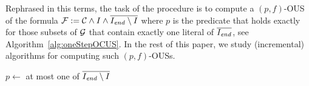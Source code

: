 Rephrased in this terms, the task of the procedure \onestep is to compute a $(p,f)$-OUS of the formula $\mathcal{F}  := \mathcal{C} \land I\land \overline{I_\mathit{end} \setminus I}$ where $p$ is the predicate that holds exactly for those subsets of $\mathcal{G} $ that contain exactly one literal of $\overline{I_\mathit{end} }$, see Algorithm~\eqref{alg:oneStepOCUS}. 
In the rest of this paper, we study (incremental) algorithms for computing such $(p,f)$-OUSs. 

\begin{algorithm}[t]
  \DontPrintSemicolon
  
  \caption{$\onestep(\formulac,f,I,\Iend)$}
  \label{alg:oneStepOCUS}
  $p \leftarrow$ at most one of $\overline{I_\mathit{end} \setminus I}$\;
\end{algorithm}



